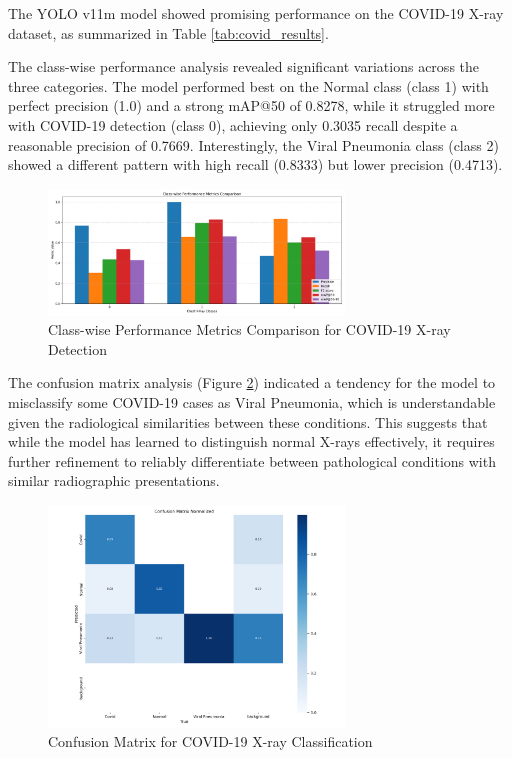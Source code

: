 \begin{multicols}{2}
The YOLO v11m model showed promising performance on the COVID-19 X-ray dataset, as summarized in Table \ref{tab:covid_results}.

The class-wise performance analysis revealed significant variations across the three categories. The model performed best on the Normal class (class 1) with perfect precision (1.0) and a strong mAP@50 of 0.8278, while it struggled more with COVID-19 detection (class 0), achieving only 0.3035 recall despite a reasonable precision of 0.7669. Interestingly, the Viral Pneumonia class (class 2) showed a different pattern with high recall (0.8333) but lower precision (0.4713).
\end{multicols}

\begin{figure}[ht]
\centering
\includegraphics[width=0.7\textwidth]{datas/x_ray_summary_datas/x_ray_class_comparison.png}
\caption{Class-wise Performance Metrics Comparison for COVID-19 X-ray Detection}
\label{fig:covid_class_metrics}
\end{figure}

\begin{multicols}{2}
The confusion matrix analysis (Figure \ref{fig:covid_confusion}) indicated a tendency for the model to misclassify some COVID-19 cases as Viral Pneumonia, which is understandable given the radiological similarities between these conditions. This suggests that while the model has learned to distinguish normal X-rays effectively, it requires further refinement to reliably differentiate between pathological conditions with similar radiographic presentations.
\end{multicols}

\begin{figure}[ht]
\centering
\includegraphics[width=0.7\textwidth]{datas/x_ray_summary_datas/x_ray_confusion_matrix_normalized.png}
\caption{Confusion Matrix for COVID-19 X-ray Classification}
\label{fig:covid_confusion}
\end{figure}

